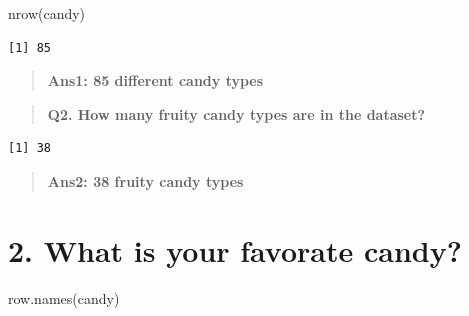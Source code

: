 \documentclass[
  letterpaper,
  DIV=11,
  numbers=noendperiod]{scrartcl}
\newenvironment{Shaded}{\begin{snugshade}}{\end{snugshade}}
\newcommand{\FunctionTok}[1]{\textcolor[rgb]{0.28,0.35,0.67}{#1}}
\newcommand{\NormalTok}[1]{\textcolor[rgb]{0.00,0.23,0.31}{#1}}
\newcommand{\SpecialCharTok}[1]{\textcolor[rgb]{0.37,0.37,0.37}{#1}}
\begin{document}
\begin{Shaded}
\begin{Highlighting}[]
\FunctionTok{nrow}\NormalTok{(candy)}
\end{Highlighting}
\end{Shaded}

\begin{verbatim}
[1] 85
\end{verbatim}

\begin{quote}
\textbf{Ans1: 85 different candy types}
\end{quote}

\begin{quote}
\textbf{Q2. How many fruity candy types are in the dataset?}
\end{quote}

\begin{Shaded}
\end{Shaded}

\begin{verbatim}
[1] 38
\end{verbatim}

\begin{quote}
\textbf{Ans2: 38 fruity candy types}
\end{quote}

\hypertarget{what-is-your-favorate-candy}{%
\section{2. What is your favorate
candy?}\label{what-is-your-favorate-candy}}

\begin{Shaded}
\begin{Highlighting}[]
\FunctionTok{row.names}\NormalTok{(candy)}
\end{Highlighting}
\end{Shaded}
\end{document}
